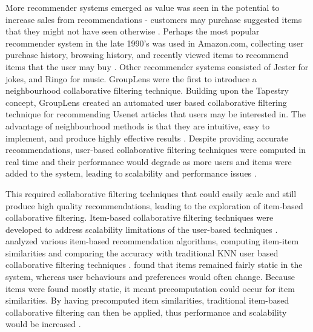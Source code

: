 More recommender systems emerged as value was seen in the potential to increase sales from recommendations - customers may purchase suggested items that they might not have seen otherwise \cite{schafer2007collaborative}. Perhaps the most popular recommender system in the late 1990's was used in Amazon.com, collecting user purchase history, browsing history, and recently viewed items to recommend items that the user may buy \cite{schafer2007collaborative}. Other recommender systems consisted of Jester \cite{goldberg} for jokes, and Ringo \cite{ringo} for music.
GroupLens \cite{grouplens} were the first to introduce a neighbourhood collaborative filtering technique. Building upon the Tapestry concept, GroupLens created an automated user based collaborative filtering technique for recommending Usenet articles that users may be interested in. The advantage of neighbourhood methods is that they are intuitive, easy to implement, and produce highly effective results \cite{survey, scalable}. Despite providing accurate recommendations, user-based collaborative filtering techniques were computed in real time and their performance would degrade as more users and items were added to the system, leading to scalability and performance issues \cite{dimension, itembased, evaluationitem}.

This required collaborative filtering techniques that could easily scale and still produce high quality recommendations, leading to the exploration of item-based collaborative filtering. Item-based collaborative filtering techniques were developed to address scalability limitations of the user-based techniques \cite{survey}. \citeauthor{itembased} analyzed various item-based recommendation algorithms, computing item-item similarities and comparing the accuracy with traditional KNN user based collaborative filtering techniques \cite{itembased}. \citeauthor{itembased} found that items remained fairly static in the system, whereas user behaviours and preferences would often change. Because items were found mostly static, it meant precomputation could occur for item similarities. By having precomputed item similarities, traditional item-based collaborative filtering can then be applied, thus performance and scalability would be increased \cite{scalable}.

